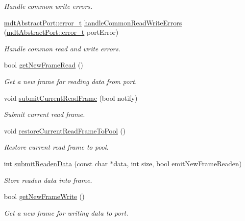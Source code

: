 \begin{DoxyCompactItemize}
\begin{DoxyCompactList}\small\item\em Handle common write errors. \end{DoxyCompactList}\item 
\hyperlink{classmdt_abstract_port_ad4121bb930c95887e77f8bafa065a85e}{mdt\-Abstract\-Port\-::error\-\_\-t} \hyperlink{classmdt_port_thread_helper_a92d8912aa908f18bd9b4d528c68b72aa}{handle\-Common\-Read\-Write\-Errors} (\hyperlink{classmdt_abstract_port_ad4121bb930c95887e77f8bafa065a85e}{mdt\-Abstract\-Port\-::error\-\_\-t} port\-Error)
\begin{DoxyCompactList}\small\item\em Handle common read and write errors. \end{DoxyCompactList}\item 
bool \hyperlink{classmdt_port_thread_helper_aed853f4cedc143c62e7dad5e38ff4b8c}{get\-New\-Frame\-Read} ()
\begin{DoxyCompactList}\small\item\em Get a new frame for reading data from port. \end{DoxyCompactList}\item 
void \hyperlink{classmdt_port_thread_helper_aec690fd203fa4dcaba36b5db781daabf}{submit\-Current\-Read\-Frame} (bool notify)
\begin{DoxyCompactList}\small\item\em Submit current read frame. \end{DoxyCompactList}\item 
void \hyperlink{classmdt_port_thread_helper_ac531bd67a8469e414fea4e5b16214d80}{restore\-Current\-Read\-Frame\-To\-Pool} ()
\begin{DoxyCompactList}\small\item\em Restore current read frame to pool. \end{DoxyCompactList}\item 
int \hyperlink{classmdt_port_thread_helper_ac433a4db4cbc8d6749a5f9fe4867b894}{submit\-Readen\-Data} (const char $\ast$data, int size, bool emit\-New\-Frame\-Readen)
\begin{DoxyCompactList}\small\item\em Store readen data into frame. \end{DoxyCompactList}\item 
bool \hyperlink{classmdt_port_thread_helper_a596b0616e64c089d5c877d86b0a75e9d}{get\-New\-Frame\-Write} ()
\begin{DoxyCompactList}\small\item\em Get a new frame for writing data to port. \end{DoxyCompactList}\item 

\end{DoxyCompactItemize}

